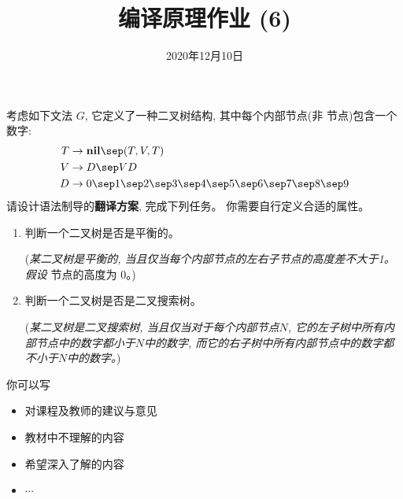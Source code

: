 \documentclass[a4paper, justified]{tufte-handout}
\title{编译原理作业 (6)}
\date{2020年12月10日}
\begin{document}
\maketitle
\noplagiarism %
\begin{abstract}
\end{abstract}
\beginrequired

\begin{problem}[\score{20 = 10 + 10}]
  考虑如下文法 $G$, 它定义了一种二叉树结构, 其中每个内部节点(非  节点)包含一个数字:
  \begin{align*}
    T &\to \text{\bf nil} \sep (T, V, T) \\
    V &\to D \sep V D \\
    D &\to 0 \sep 1 \sep 2 \sep 3 \sep 4 \sep 5 \sep 6 \sep 7 \sep 8 \sep 9
  \end{align*}
  请设计语法制导的{\bf 翻译方案}, 完成下列任务。
  你需要自行定义合适的属性。
  \begin{enumerate}[(1)]
    \item 判断一个二叉树是否是平衡的。

    ({\it 某二叉树是平衡的, 当且仅当每个内部节点的左右子节点的高度差不大于1。
        假设 } 节点的高度为 0。)
    \item 判断一个二叉树是否是二叉搜索树。

    ({\it 某二叉树是二叉搜索树, 当且仅当对于每个内部节点$N$,
        它的左子树中所有内部节点中的数字都小于$N$中的数字,
        而它的右子树中所有内部节点中的数字都不小于$N$中的数字。})
  \end{enumerate}
\end{problem}

\begin{solution}
\end{solution}



\beginfb

你可以写
\begin{itemize}
  \item 对课程及教师的建议与意见
  \item 教材中不理解的内容
  \item 希望深入了解的内容
  \item $\cdots$
\end{itemize}
\end{document}
